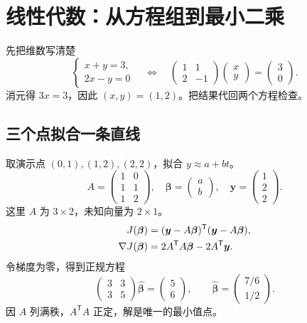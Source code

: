 \section{线性代数：从方程组到最小二乘}\label{ch:linear}
\begin{conceptbox}{先把维数写清楚}
\[
  \begin{cases}x+y=3,\\2x-y=0\end{cases}
  \quad\Longleftrightarrow\quad
  \begin{pmatrix}1&1\\2&-1\end{pmatrix}
  \begin{pmatrix}x\\y\end{pmatrix}
  =\begin{pmatrix}3\\0\end{pmatrix}.
\]
消元得 \(3x=3\)，因此 \((x,y)=(1,2)\)。把结果代回两个方程检查。
\end{conceptbox}

\subsection{三个点拟合一条直线}
取演示点 \((0,1),(1,2),(2,2)\)，拟合 \(y\approx a+bt\)。
\[
  A=\begin{pmatrix}1&0\\1&1\\1&2\end{pmatrix},\quad
  \bm{\beta}=\begin{pmatrix}a\\b\end{pmatrix},\quad
  \bm{y}=\begin{pmatrix}1\\2\\2\end{pmatrix}.
\]
这里 \(A\) 为 \(3\times2\)，未知向量为 \(2\times1\)。
\begin{align}
  J(\bm{\beta})
    &=(\bm{y}-A\bm{\beta})^{\mathsf T}(\bm{y}-A\bm{\beta}),\notag\\
  \nabla J(\bm{\beta})
    &=2A^{\mathsf T}A\bm{\beta}-2A^{\mathsf T}\bm{y}.\label{eq:gradient}
\end{align}
令梯度为零，得到正规方程
\[
  \begin{pmatrix}3&3\\3&5\end{pmatrix}\widehat{\bm{\beta}}
  =\begin{pmatrix}5\\6\end{pmatrix},\qquad
  \widehat{\bm{\beta}}=\begin{pmatrix}7/6\\1/2\end{pmatrix}.
\]
因 \(A\) 列满秩，\(A^{\mathsf T}A\) 正定，解是唯一的最小值点。

